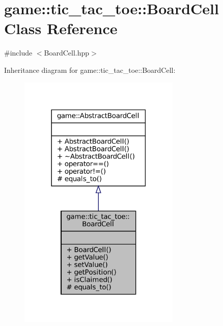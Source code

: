 \hypertarget{classgame_1_1tic__tac__toe_1_1_board_cell}{}\section{game\+:\+:tic\+\_\+tac\+\_\+toe\+:\+:Board\+Cell Class Reference}
\label{classgame_1_1tic__tac__toe_1_1_board_cell}


{\ttfamily \#include $<$Board\+Cell.\+hpp$>$}



Inheritance diagram for game\+:\+:tic\+\_\+tac\+\_\+toe\+:\+:Board\+Cell\+:
\nopagebreak
\begin{figure}[H]
\begin{center}
\leavevmode
\includegraphics[width=218pt]{classgame_1_1tic__tac__toe_1_1_board_cell__inherit__graph}
\end{center}
\end{figure}


